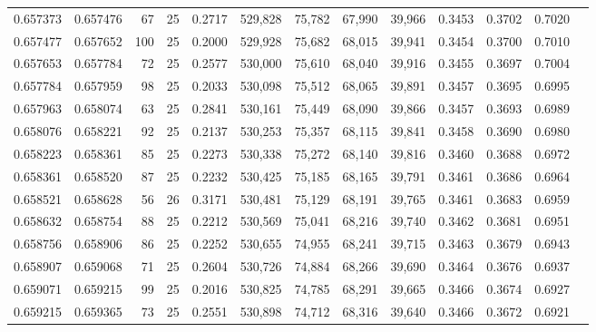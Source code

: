 \begin{tabular}{rrrrrrrrrrrrr}
0.657373 & 0.657476 &    67 &  25 &                                     0.2717 & 529,828 &  75,782 &  67,990 &  39,966 & 0.3453 & 0.3702 & 0.7020 \\
0.657477 & 0.657652 &   100 &  25 &                                     0.2000 & 529,928 &  75,682 &  68,015 &  39,941 & 0.3454 & 0.3700 & 0.7010 \\
0.657653 & 0.657784 &    72 &  25 &                                     0.2577 & 530,000 &  75,610 &  68,040 &  39,916 & 0.3455 & 0.3697 & 0.7004 \\
0.657784 & 0.657959 &    98 &  25 &                                     0.2033 & 530,098 &  75,512 &  68,065 &  39,891 & 0.3457 & 0.3695 & 0.6995 \\
0.657963 & 0.658074 &    63 &  25 &                                     0.2841 & 530,161 &  75,449 &  68,090 &  39,866 & 0.3457 & 0.3693 & 0.6989 \\
0.658076 & 0.658221 &    92 &  25 &                                     0.2137 & 530,253 &  75,357 &  68,115 &  39,841 & 0.3458 & 0.3690 & 0.6980 \\
0.658223 & 0.658361 &    85 &  25 &                                     0.2273 & 530,338 &  75,272 &  68,140 &  39,816 & 0.3460 & 0.3688 & 0.6972 \\
0.658361 & 0.658520 &    87 &  25 &                                     0.2232 & 530,425 &  75,185 &  68,165 &  39,791 & 0.3461 & 0.3686 & 0.6964 \\
0.658521 & 0.658628 &    56 &  26 &                                     0.3171 & 530,481 &  75,129 &  68,191 &  39,765 & 0.3461 & 0.3683 & 0.6959 \\
0.658632 & 0.658754 &    88 &  25 &                                     0.2212 & 530,569 &  75,041 &  68,216 &  39,740 & 0.3462 & 0.3681 & 0.6951 \\
0.658756 & 0.658906 &    86 &  25 &                                     0.2252 & 530,655 &  74,955 &  68,241 &  39,715 & 0.3463 & 0.3679 & 0.6943 \\
0.658907 & 0.659068 &    71 &  25 &                                     0.2604 & 530,726 &  74,884 &  68,266 &  39,690 & 0.3464 & 0.3676 & 0.6937 \\
0.659071 & 0.659215 &    99 &  25 &                                     0.2016 & 530,825 &  74,785 &  68,291 &  39,665 & 0.3466 & 0.3674 & 0.6927 \\
0.659215 & 0.659365 &    73 &  25 &                                     0.2551 & 530,898 &  74,712 &  68,316 &  39,640 & 0.3466 & 0.3672 & 0.6921 \\

\end{tabular}
